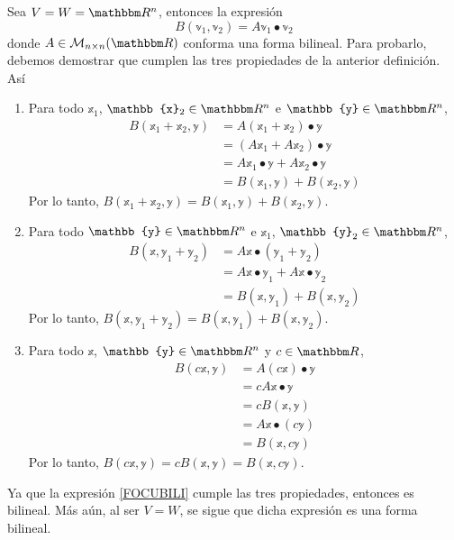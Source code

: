 \begin{example}
    Sea $V = W = \RR[n]$, entonces la expresión
    \begin{equation}
        B(\mathbb{v}_1, \mathbb{v}_2) = A\mathbb{v}_1 \bullet \mathbb{v}_2 \label{FOCUBILI}
    \end{equation}
    donde $A \in \mathcal{M}_{n \times n}(\RR)$ conforma una forma bilineal. Para probarlo, debemos demostrar que cumplen las tres propiedades de la anterior definición. Así
    \begin{enumerate}[label=\roman*)]
        \item Para todo $\mathbb{x}_1$, $\mathbb{x}_2 \in \RR[n]$ e $\mathbb{y} \in \RR[n]$,
        \begin{align*}
            B(\mathbb{x}_1 + \mathbb{x}_2, \mathbb{y}) & = A(\mathbb{x}_1 + \mathbb{x}_2) \bullet \mathbb{y} \\
            & = (A\mathbb{x}_1 + A\mathbb{x}_2) \bullet \mathbb{y} \\
            & = A\mathbb{x}_1 \bullet \mathbb{y} + A\mathbb{x}_2 \bullet \mathbb{y} \\
            & = B(\mathbb{x}_1, \mathbb{y}) + B(\mathbb{x}_2, \mathbb{y})
        \end{align*}
        Por lo tanto, $B(\mathbb{x}_1 + \mathbb{x}_2, \mathbb{y}) = B(\mathbb{x}_1, \mathbb{y}) + B(\mathbb{x}_2, \mathbb{y})$.
        \item Para todo $\mathbb{y} \in \RR[n]$ e $\mathbb{x}_1$, $\mathbb{y}_2 \in \RR[n]$,
        \begin{align*}
            B(\mathbb{x}, \mathbb{y}_1 + \mathbb{y}_2) & = A\mathbb{x} \bullet (\mathbb{y}_1 + \mathbb{y}_2) \\
            & = A\mathbb{x} \bullet \mathbb{y}_1 + A\mathbb{x} \bullet \mathbb{y}_2 \\
            & = B(\mathbb{x}, \mathbb{y}_1) + B(\mathbb{x}, \mathbb{y}_2)
        \end{align*}
        Por lo tanto, $B(\mathbb{x}, \mathbb{y}_1 + \mathbb{y}_2) = B(\mathbb{x}, \mathbb{y}_1) + B(\mathbb{x}, \mathbb{y}_2)$.
        \item Para todo $\mathbb{x}$, $\mathbb{y} \in \RR[n]$ y $c \in \RR$,
        \begin{align*}
            B(c\mathbb{x}, \mathbb{y}) & = A(c\mathbb{x}) \bullet \mathbb{y} \\
            & = cA\mathbb{x} \bullet \mathbb{y} \\
            & = cB(\mathbb{x}, \mathbb{y}) \\
            & = A\mathbb{x} \bullet (c\mathbb{y}) \\
            & = B(\mathbb{x}, c\mathbb{y})
        \end{align*}
        Por lo tanto, $B(c\mathbb{x}, \mathbb{y}) = cB(\mathbb{x}, \mathbb{y}) = B(\mathbb{x}, c\mathbb{y})$.
    \end{enumerate}
    Ya que la expresión \eqref{FOCUBILI} cumple las tres propiedades, entonces es bilineal. Más aún, al ser $V = W$, se sigue que dicha expresión es una forma bilineal.
\end{example}

